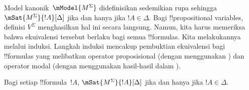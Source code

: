 \documentclass[../../../include/open-logic-section]{subfiles}
\begin{document}


Model kanonik~$\mModel{M^\Sigma}$ didefinisikan sedemikian rupa sehingga
$\mSat{M^\Sigma}{!A}[\Delta]$ jika dan hanya jika $!A \in \Delta$. Bagi
!!{propositional variable}s, definisi $V^\Sigma$ menghasilkan hal ini secara
langsung. Namun, kita harus memeriksa bahwa ekuivalensi tersebut berlaku bagi
semua !!{formula}s. Kita melakukannya melalui induksi. Langkah induksi
mencakup pembuktian ekuivalensi bagi !!{formula}s yang melibatkan operator
proposisional (dengan menggunakan ) dan
operator modal (dengan menggunakan hasil-hasil dalam ).

\begin{prop}
  Bagi setiap !!{formula}~$!A$, $\mSat{M^\Sigma}{!A}[\Delta]$ jika dan hanya jika
  $!A \in \Delta$.
\end{prop}
\end{document}
